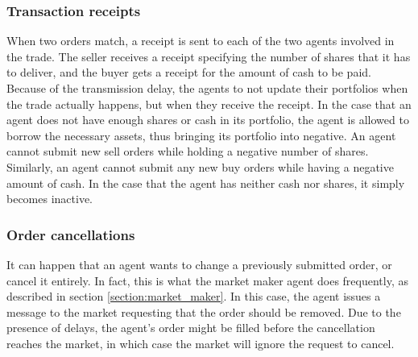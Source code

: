 \subsubsection{Transaction receipts}
When two orders match, a receipt is sent to each of the two agents involved in the trade. The seller receives a receipt specifying the number of shares that it has to deliver, and the buyer gets a receipt for the amount of cash to be paid. Because of the transmission delay, the agents to not update their portfolios when the trade actually happens, but when they receive the receipt. In the case that an agent does not have enough shares or cash in its portfolio, the agent is allowed to borrow the necessary assets, thus bringing its portfolio into negative. An agent cannot submit new sell orders while holding a negative number of shares. Similarly, an agent cannot submit any new buy orders while having a negative amount of cash. In the case that the agent has neither cash nor shares, it simply becomes inactive.

\subsubsection{Order cancellations}
It can happen that an agent wants to change a previously submitted order, or cancel it entirely. In fact, this is what the market maker agent does frequently, as described in section \ref{section:market_maker}. In this case, the agent issues a message to the market requesting that the order should be removed. Due to the presence of delays, the agent's order might be filled before the cancellation reaches the market, in which case the market will ignore the request to cancel.

